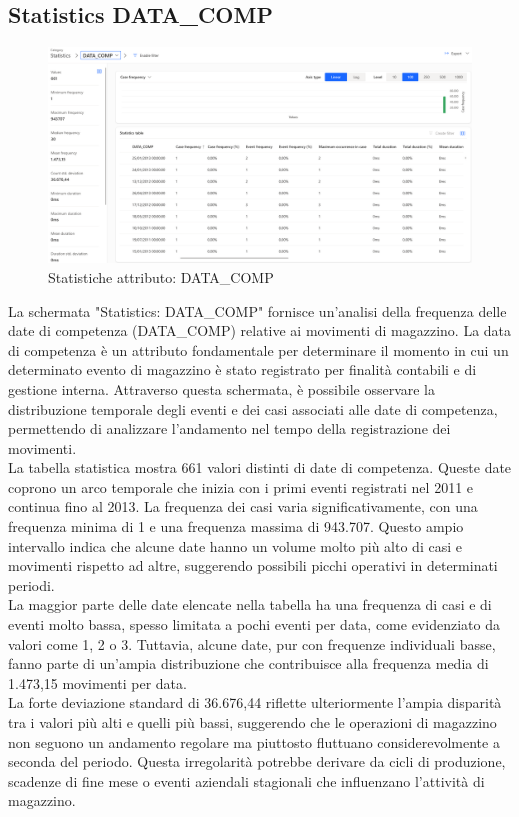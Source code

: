 \documentclass{article}
\begin{document}
\subsection{Statistics DATA\_COMP}
\begin{figure}[H]
    \centering
    \includegraphics[width=\textwidth]{imgMicrosoft/DatiReali/StatisticsDATACOMPDatiReali.png}
    \caption{Statistiche attributo: DATA\_COMP}
    \label{fig:statistics-DATA-COMP}
\end{figure}
La schermata "Statistics: DATA\_COMP" fornisce un'analisi della frequenza delle date di competenza (DATA\_COMP) relative ai movimenti di magazzino. La data di competenza è un attributo fondamentale per determinare il momento in cui un determinato evento di magazzino è stato registrato per finalità contabili e di gestione interna. Attraverso questa schermata, è possibile osservare la distribuzione temporale degli eventi e dei casi associati alle date di competenza, permettendo di analizzare l'andamento nel tempo della registrazione dei movimenti.\\
La tabella statistica mostra 661 valori distinti di date di competenza. Queste date coprono un arco temporale che inizia con i primi eventi registrati nel 2011 e continua fino al 2013. La frequenza dei casi varia significativamente, con una frequenza minima di 1 e una frequenza massima di 943.707. Questo ampio intervallo indica che alcune date hanno un volume molto più alto di casi e movimenti rispetto ad altre, suggerendo possibili picchi operativi in determinati periodi.\\
La maggior parte delle date elencate nella tabella ha una frequenza di casi e di eventi molto bassa, spesso limitata a pochi eventi per data, come evidenziato da valori come 1, 2 o 3. Tuttavia, alcune date, pur con frequenze individuali basse, fanno parte di un'ampia distribuzione che contribuisce alla frequenza media di 1.473,15 movimenti per data.\\
La forte deviazione standard di 36.676,44 riflette ulteriormente l'ampia disparità tra i valori più alti e quelli più bassi, suggerendo che le operazioni di magazzino non seguono un andamento regolare ma piuttosto fluttuano considerevolmente a seconda del periodo. Questa irregolarità potrebbe derivare da cicli di produzione, scadenze di fine mese o eventi aziendali stagionali che influenzano l'attività di magazzino.\\
\end{document}
